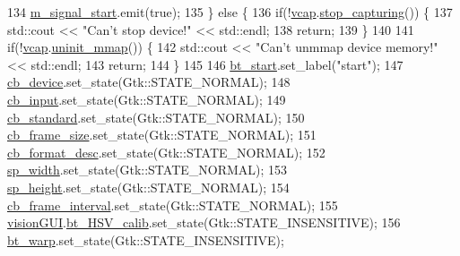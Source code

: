 \begin{DoxyCode}
134             \hyperlink{class_v_s_s_s___g_u_i_1_1_v4_l_interface_a106a19f83b60b118984f3aece410d140}{m\_signal\_start}.emit(\textcolor{keyword}{true});
135         \} \textcolor{keywordflow}{else} \{
136             \textcolor{keywordflow}{if}(!\hyperlink{class_v_s_s_s___g_u_i_1_1_v4_l_interface_a7ece61f4ccc6d5321c445e60f34e7f33}{vcap}.\hyperlink{classv4lcap_a2992ae4b4fd36da602284c62b97cbeed}{stop\_capturing}()) \{
137                 std::cout << \textcolor{stringliteral}{"Can't stop device!"} << std::endl;
138                 \textcolor{keywordflow}{return};
139             \}
140 
141             \textcolor{keywordflow}{if}(!\hyperlink{class_v_s_s_s___g_u_i_1_1_v4_l_interface_a7ece61f4ccc6d5321c445e60f34e7f33}{vcap}.\hyperlink{classv4lcap_aafab5fd381c1d5858cd87f42560a40ab}{uninit\_mmap}()) \{
142                 std::cout << \textcolor{stringliteral}{"Can't unmmap device memory!"} << std::endl;
143                 \textcolor{keywordflow}{return};
144             \}
145 
146             \hyperlink{class_v_s_s_s___g_u_i_1_1_v4_l_interface_a95958ffffbfb95a6a0fdefb2ffa6d3b9}{bt\_start}.set\_label(\textcolor{stringliteral}{"start"});
147             \hyperlink{class_v_s_s_s___g_u_i_1_1_v4_l_interface_a9aebd92fe12b9b5acc25b1113dbd022e}{cb\_device}.set\_state(Gtk::STATE\_NORMAL);
148             \hyperlink{class_v_s_s_s___g_u_i_1_1_v4_l_interface_af7c647eefb3e6f7cf8e0fdc170619922}{cb\_input}.set\_state(Gtk::STATE\_NORMAL);
149             \hyperlink{class_v_s_s_s___g_u_i_1_1_v4_l_interface_ae78aa74f420bbb92b59ff0e0f0ac3b1e}{cb\_standard}.set\_state(Gtk::STATE\_NORMAL);
150             \hyperlink{class_v_s_s_s___g_u_i_1_1_v4_l_interface_ad6dd4704d3b7d1f262843dd148269b73}{cb\_frame\_size}.set\_state(Gtk::STATE\_NORMAL);
151             \hyperlink{class_v_s_s_s___g_u_i_1_1_v4_l_interface_a1f6b2f08ccbc0ecbfba96311ac07aa44}{cb\_format\_desc}.set\_state(Gtk::STATE\_NORMAL);
152             \hyperlink{class_v_s_s_s___g_u_i_1_1_v4_l_interface_a0f492cb2c65c4021c9b9b81f4a185e84}{sp\_width}.set\_state(Gtk::STATE\_NORMAL);
153             \hyperlink{class_v_s_s_s___g_u_i_1_1_v4_l_interface_a7b095a3a9dc7a5895f3bac68b05b8210}{sp\_height}.set\_state(Gtk::STATE\_NORMAL);
154             \hyperlink{class_v_s_s_s___g_u_i_1_1_v4_l_interface_ad07b3bbad672e676e128f19a12f07e73}{cb\_frame\_interval}.set\_state(Gtk::STATE\_NORMAL);
155             \hyperlink{class_v_s_s_s___g_u_i_1_1_v4_l_interface_a7a2432ad62a960423bc3370abe5c8930}{visionGUI}.\hyperlink{class_vision_g_u_i_a9506af83c1ee97d1b4f32b3fbb53fc48}{bt\_HSV\_calib}.set\_state(Gtk::STATE\_INSENSITIVE);
156             \hyperlink{class_v_s_s_s___g_u_i_1_1_v4_l_interface_a6cdcc092c26848cd7009e56084ee1b23}{bt\_warp}.set\_state(Gtk::STATE\_INSENSITIVE);

\end{DoxyCode}
